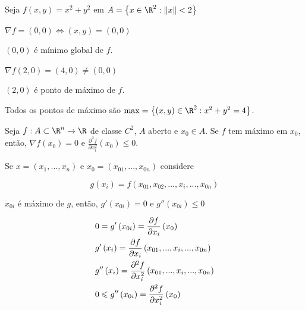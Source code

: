 \documentclass{book}
\begin{document}
\begin{ex}
    Seja $f\left( {x,y} \right) = x^2  + y^2$ em $A = \left\{ {x \in \R^2 :\left\| x \right\| < 2} \right\}$
\end{ex}

\begin{sol}
    $\nabla f = \left( {0,0} \right) \Leftrightarrow \left( {x,y} \right) = \left( {0,0} \right)$

$\left( {0,0} \right)$ \'e m\'inimo global de $f$.

$\nabla f\left( {2,0} \right) = \left( {4,0} \right) \ne \left( {0,0} \right)$

$\left( {2,0} \right)$ \'e ponto de m\'aximo de $f$.

    Todos os pontos de m\'aximo s\~ao $\max  = \left\{ {\left( {x,y} \right) \in \R^2 :x^2  + y^2  = 4} \right\}$.
\end{sol}

\begin{teo}
    Seja $f:A \subset \R^n \to \R$ de classe $C^2$, $A$ aberto e $x_0 \in A$. Se $f$ tem m\'aximo em $x_0$, ent\~ao, $\nabla f\left( {x_0 } \right) = 0$ e $\displaystyle \frac{{\partial ^2 f}}{{\partial x_i^2 }}\left( {x_0 } \right) \leqslant 0$.
\end{teo}

\begin{dem}
    Se $x = \left( {x_1 ,...,x_n } \right)$ e $x_0  = \left( {x_{01} ,...,x_{0n} } \right)$ considere

\[
    g\left( {x_i } \right) = f\left( {x_{01} ,x_{02} ,...,x_i ,...,x_{0n} } \right)
\]

    $x_{0i}$ \'e m\'aximo de $g$, ent\~ao, $g'\left( {x_{0i} } \right) = 0$ e $g''\left( {x_{0i} } \right) \leqslant 0$

\[
\begin{gathered}
0 = g'\left( {x_{0i} } \right) = \frac{{\partial f}}
{{\partial x_i }}\left( {x_0 } \right) \hfill \\
g'\left( {x_i } \right) = \frac{{\partial f}}
{{\partial x_i }}\left( {x_{01} ,...,x_i ,...,x_{0n} } \right) \hfill \\
g''\left( {x_i } \right) = \frac{{\partial ^2 f}}
{{\partial x_i^2 }}\left( {x_{01} ,...,x_i ,...,x_{0n} } \right) \hfill \\
0 \leqslant g''\left( {x_{0i} } \right) = \frac{{\partial ^2 f}}
{{\partial x_i^2 }}\left( {x_0 } \right) \hfill \\
\end{gathered}
\]

\end{dem}
\end{document}

